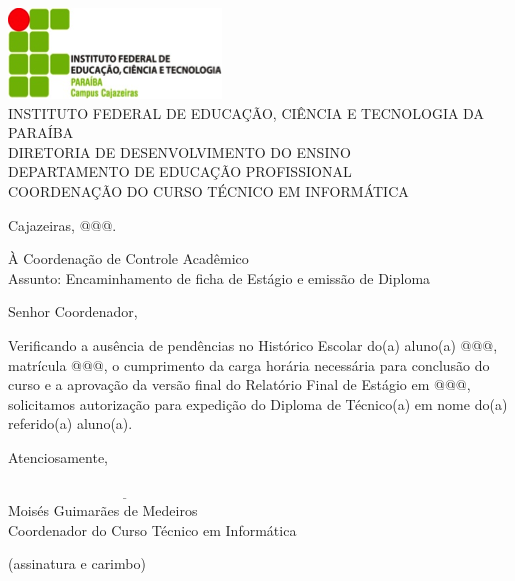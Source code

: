 \documentclass[a4paper, 12pt]{letter}
\begin{document}
{\bf

\begin{center}
\includegraphics{images/logo}\\
INSTITUTO FEDERAL DE EDUCAÇÃO, CIÊNCIA E TECNOLOGIA DA PARAÍBA\\
DIRETORIA DE DESENVOLVIMENTO DO ENSINO\\
DEPARTAMENTO DE EDUCAÇÃO PROFISSIONAL\\
COORDENAÇÃO DO CURSO TÉCNICO EM INFORMÁTICA
\end{center}
\vspace{0.5cm}

\begin{flushright}
Cajazeiras, @@@.
\end{flushright}

\noindent À Coordenação de Controle Acadêmico\\
Assunto: Encaminhamento de ficha de Estágio e emissão de Diploma

\noindent Senhor Coordenador,

\onehalfspacing Verificando a ausência de pendências no Histórico Escolar do(a) aluno(a)\linebreak
@@@, matrícula @@@, o cumprimento da carga horária necessária para conclusão do curso e a aprovação da versão final do Relatório Final de Estágio  em @@@, solicitamos autorização para expedição do Diploma de Técnico(a) em nome do(a) referido(a) aluno(a).
\vspace{0.5cm}

Atenciosamente,

\indent $\underline{\hspace{7cm}}$\\
\indent Moisés Guimarães de Medeiros\\
\indent Coordenador do Curso Técnico em Informática\\
}
\indent (assinatura e carimbo)
\end{document}
